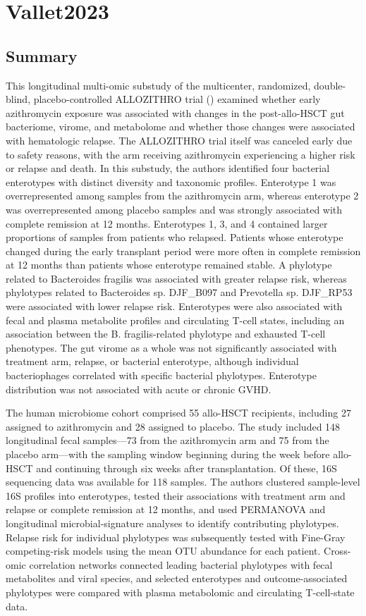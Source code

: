 \documentclass[11pt,a4paper]{article}
\begin{document}
\section{Vallet2023}
\subsection{Summary}
This longitudinal multi-omic substudy of the multicenter, randomized, double-blind, placebo-controlled ALLOZITHRO trial (\cite{Bergeron2017}) examined whether early azithromycin exposure was associated with changes in the post-allo-HSCT gut bacteriome, virome, and metabolome and whether those changes were associated with hematologic relapse. The ALLOZITHRO trial itself was canceled early due to safety reasons, with the arm receiving azithromycin experiencing a higher risk or relapse and death. In this substudy, the authors identified four bacterial enterotypes with distinct diversity and taxonomic profiles. Enterotype 1 was overrepresented among samples from the azithromycin arm, whereas enterotype 2 was overrepresented among placebo samples and was strongly associated with complete remission at 12 months. Enterotypes 1, 3, and 4 contained larger proportions of samples from patients who relapsed. Patients whose enterotype changed during the early transplant period were more often in complete remission at 12 months than patients whose enterotype remained stable. A phylotype related to Bacteroides fragilis was associated with greater relapse risk, whereas phylotypes related to Bacteroides sp. DJF\_B097 and Prevotella sp. DJF\_RP53 were associated with lower relapse risk. Enterotypes were also associated with fecal and plasma metabolite profiles and circulating T-cell states, including an association between the B. fragilis-related phylotype and exhausted T-cell phenotypes. The gut virome as a whole was not significantly associated with treatment arm, relapse, or bacterial enterotype, although individual bacteriophages correlated with specific bacterial phylotypes. Enterotype distribution was not associated with acute or chronic GVHD.

The human microbiome cohort comprised 55 allo-HSCT recipients, including 27 assigned to azithromycin and 28 assigned to placebo. The study included 148 longitudinal fecal samples—73 from the azithromycin arm and 75 from the placebo arm—with the sampling window beginning during the week before allo-HSCT and continuing through six weeks after transplantation. Of these, 16S sequencing data was available for 118 samples. The authors clustered sample-level 16S profiles into enterotypes, tested their associations with treatment arm and relapse or complete remission at 12 months, and used PERMANOVA and longitudinal microbial-signature analyses to identify contributing phylotypes. Relapse risk for individual phylotypes was subsequently tested with Fine-Gray competing-risk models using the mean OTU abundance for each patient. Cross-omic correlation networks connected leading bacterial phylotypes with fecal metabolites and viral species, and selected enterotypes and outcome-associated phylotypes were compared with plasma metabolomic and circulating T-cell-state data.
\end{document}
